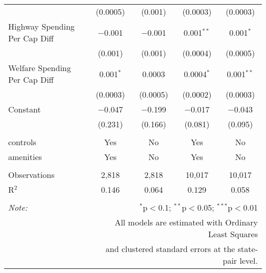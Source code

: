 \begin{table}[!htbp]
\begin{tabular}{@{\extracolsep{5pt}}lcccc}
  & (0.0005) & (0.001) & (0.0003) & (0.0003) \\ 
  Highway Spending Per Cap Diff & $-$0.001 & $-$0.001 & 0.001$^{**}$ & 0.001$^{*}$ \\ 
  & (0.001) & (0.001) & (0.0004) & (0.0005) \\ 
  Welfare Spending Per Cap Diff & 0.001$^{*}$ & 0.0003 & 0.0004$^{*}$ & 0.001$^{**}$ \\ 
  & (0.0003) & (0.0005) & (0.0002) & (0.0003) \\ 
  Constant & $-$0.047 & $-$0.199 & $-$0.017 & $-$0.043 \\ 
  & (0.231) & (0.166) & (0.081) & (0.095) \\ 
 \hline \\[-1.8ex] 
controls & Yes & No & Yes & No \\ 
amenities & Yes & No & Yes & No \\ 
\hline \\[-1.8ex] 
Observations & 2,818 & 2,818 & 10,017 & 10,017 \\ 
R$^{2}$ & 0.146 & 0.064 & 0.129 & 0.058 \\ 
\hline 
\hline \\[-1.8ex] 
\textit{Note:}  & \multicolumn{4}{r}{$^{*}$p$<$0.1; $^{**}$p$<$0.05; $^{***}$p$<$0.01} \\ 
 & \multicolumn{4}{r}{All models are estimated with Ordinary Least Squares} \\ 
 & \multicolumn{4}{r}{and clustered standard errors at the state-pair level.} \\ 
\end{tabular} 
\end{table} 
